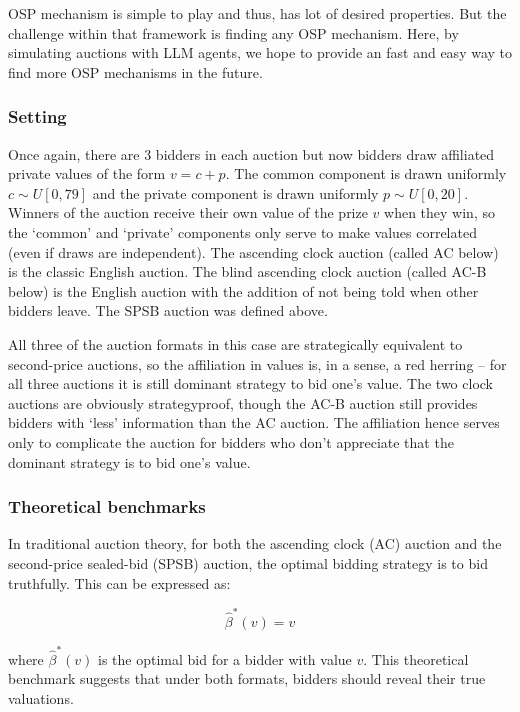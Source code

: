 \documentclass{article} %
\begin{document}
OSP mechanism is simple to play and thus, has lot of desired properties. 
But the challenge within that framework is finding any OSP mechanism. 
Here, by simulating auctions with LLM agents, we hope to provide an fast and easy way to find more OSP mechanisms in the future.


\subsubsection{Setting}
Once again, there are $3$ bidders in each auction but now bidders draw affiliated private values of the form $v = c + p$. 
The common component is drawn uniformly $c \sim U[0, 79]$ and the private component is drawn uniformly $p \sim U[0, 20]$. 
Winners of the auction receive their own value of the prize $v$ when they win, so the `common' and `private' components only serve to make values correlated (even if draws are independent). 
The ascending clock auction (called AC below) is the classic English auction. 
The blind ascending clock auction (called AC-B below) is the English auction with the addition of not being told when other bidders leave. 
The SPSB auction was defined above. 

All three of the auction formats in this case are strategically equivalent to second-price auctions, so the affiliation in values is, in a sense, a red herring -- for all three auctions it is still dominant strategy to bid one's value. 
The two clock auctions are obviously strategyproof, though the AC-B auction still provides bidders with `less' information than the AC auction. 
The affiliation hence serves only to complicate the auction for bidders who don't appreciate that the dominant strategy is to bid one's value. 

\subsubsection{Theoretical benchmarks}

In traditional auction theory, for both the ascending clock (AC) auction and the second-price sealed-bid (SPSB) auction, the optimal bidding strategy is to bid truthfully. This can be expressed as:

\begin{equation}
    \hat{\beta}^*(v) = v
\end{equation}

where $\hat{\beta}^*(v)$ is the optimal bid for a bidder with value $v$. This theoretical benchmark suggests that under both formats, bidders should reveal their true valuations.
\end{document}
